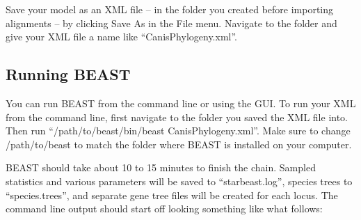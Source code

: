 \documentclass[12pt]{article}
\begin{document}
Save your model as an XML file -- in the folder you created before importing
alignments -- by clicking Save As in the File menu. Navigate to the folder
and give your XML file a name like ``CanisPhylogeny.xml''.

\subsection{Running BEAST}
\label{subsec:runningBEAST}

You can run BEAST from the command line or using the GUI. To run your XML
from the command line, first navigate to the folder you saved the XML file into.
Then run ``/path/to/beast/bin/beast CanisPhylogeny.xml''. Make sure to change
/path/to/beast to match the folder where BEAST is installed on your computer.

BEAST should take about 10 to 15 minutes to finish the chain. Sampled statistics
and various parameters will be saved to ``starbeast.log'', species trees to
``species.trees'', and separate gene tree files will be created for each locus. The command line
output should start off looking something like what follows:
\end{document}
